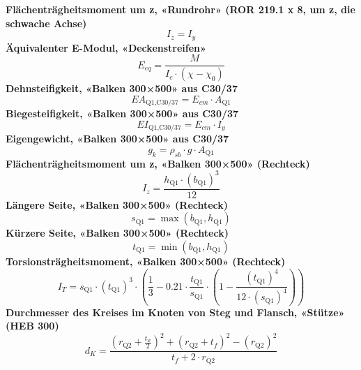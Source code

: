 \documentclass[11pt,a4paper]{article}
\begin{document}
\noindent\textbf{Flächenträgheitsmoment um z, «Rundrohr» (ROR 219.1 x 8, um z, die schwache Achse)}
\begin{equation*}
I_{z} = I_{y}
\end{equation*}
\noindent\textbf{Äquivalenter E-Modul, «Deckenstreifen»}
\begin{equation*}
E_{eq} = \frac{M}{I_c \cdot \left(\chi - \chi_0\right)}
\end{equation*}
\noindent\textbf{Dehnsteifigkeit, «Balken 300×500» aus C30/37}
\begin{equation*}
EA_{\text{Q1,C30/37}} = E_{cm} \cdot A_{\text{Q1}}
\end{equation*}
\noindent\textbf{Biegesteifigkeit, «Balken 300×500» aus C30/37}
\begin{equation*}
EI_{\text{Q1,C30/37}} = E_{cm} \cdot I_{y}
\end{equation*}
\noindent\textbf{Eigengewicht, «Balken 300×500» aus C30/37}
\begin{equation*}
g_{k} = \rho_{sb} \cdot g \cdot A_{\text{Q1}}
\end{equation*}
\noindent\textbf{Flächenträgheitsmoment um z, «Balken 300×500» (Rechteck)}
\begin{equation*}
I_{z} = \frac{h_{\text{Q1}} \cdot \left(b_{\text{Q1}}\right)^{3}}{12}
\end{equation*}
\noindent\textbf{Längere Seite, «Balken 300×500» (Rechteck)}
\begin{equation*}
s_{\text{Q1}} = \max\left(b_{\text{Q1}}, h_{\text{Q1}}\right)
\end{equation*}
\noindent\textbf{Kürzere Seite, «Balken 300×500» (Rechteck)}
\begin{equation*}
t_{\text{Q1}} = \min\left(b_{\text{Q1}}, h_{\text{Q1}}\right)
\end{equation*}
\noindent\textbf{Torsionsträgheitsmoment, «Balken 300×500» (Rechteck)}
\begin{equation*}
I_{T} = s_{\text{Q1}} \cdot \left(t_{\text{Q1}}\right)^{3} \cdot \left(\frac{1}{3} - 0.21 \cdot \frac{t_{\text{Q1}}}{s_{\text{Q1}}} \cdot \left(1 - \frac{\left(t_{\text{Q1}}\right)^{4}}{12 \cdot \left(s_{\text{Q1}}\right)^{4}}\right)\right)
\end{equation*}
\noindent\textbf{Durchmesser des Kreises im Knoten von Steg und Flansch, «Stütze» (HEB 300)}
\begin{equation*}
d_{K} = \frac{\left(r_{\text{Q2}} + \frac{t_{w}}{2}\right)^{2} + \left(r_{\text{Q2}} + t_{f}\right)^{2} - \left(r_{\text{Q2}}\right)^{2}}{t_{f} + 2 \cdot r_{\text{Q2}}}
\end{equation*}
\end{document}
